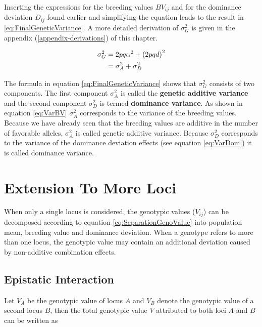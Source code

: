 \documentclass[
]{book}
\theoremstyle{definition}
\theoremstyle{definition}
\theoremstyle{definition}
\theoremstyle{remark}
\begin{document}
Inserting the expressions for the breeding values \(BV_{ij}\) and for the dominance deviation \(D_{ij}\) found earlier and simplifying the equation leads to the result in \eqref{eq:FinalGeneticVariance}. A more detailed derivation of \(\sigma_G^2\) is given in the appendix (\ref{appendix-derivations}) of this chapter.

\begin{align}
  \sigma_G^2 &=  2pq\alpha^2 + \left(2pqd \right)^2 \notag\\
             &=  \sigma_A^2 + \sigma_D^2
\label{eq:FinalGeneticVariance}             
\end{align}

The formula in equation \eqref{eq:FinalGeneticVariance} shows that \(\sigma_G^2\) consists of two components. The first component \(\sigma_A^2\) is called the \textbf{genetic additive variance} and the second component \(\sigma_D^2\) is termed \textbf{dominance variance}. As shown in equation \eqref{eq:VarBV} \(\sigma_A^2\) corresponds to the variance of the breeding values. Because we have already seen that the breeding values are additive in the number of favorable alleles, \(\sigma_A^2\) is called genetic additive variance. Because \(\sigma_D^2\) corresponds to the variance of the dominance deviation effects (see equation \eqref{eq:VarDom}) it is called dominance variance.

\hypertarget{extension-to-more-loci}{%
\section{Extension To More Loci}\label{extension-to-more-loci}}

When only a single locus is considered, the genotypic values (\(V_{ij}\)) can be decomposed according to equation \eqref{eq:SeparationGenoValue} into population mean, breeding value and dominance deviation. When a genotype refers to more than one locus, the genotypic value may contain an additional deviation caused by non-additive combination effects.

\hypertarget{epistatic-interaction}{%
\subsection{Epistatic Interaction}\label{epistatic-interaction}}

Let \(V_A\) be the genotypic value of locus \(A\) and \(V_B\) denote the genotypic value of a second locus \(B\), then the total genotypic value \(V\) attributed to both loci \(A\) and \(B\) can be written as
\end{document}
